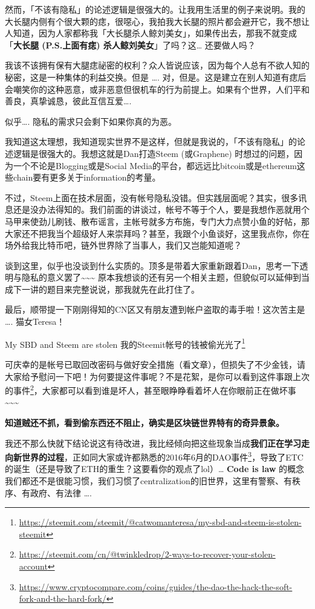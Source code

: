 \documentclass[]{ctexbook}
\renewcommand{\href}[2]{#2\footnote{\url{#1}}}
\begin{document}
然而，「不该有隐私」的论述逻辑是很强大的。让我用生活里的例子来说明。我的大长腿内侧有个很大颗的痣，很噁心，我拍我大长腿的照片都会避开它，我不想让人知道，因为人家都称我「大长腿杀人鲸刘美女」，如果传出去，那我不就变成「\textbf{大长腿 (P.S.上面有痣) 杀人鲸刘美女}」了吗？这\ldots{} 还要做人吗？

我该不该拥有保有大腿痣祕密的权利？众人皆说应该，因为每个人总有不欲人知的秘密，这是一种集体的利益交换。但是 \ldots{}. 对，但是。这是建立在别人知道有痣后会嘲笑你的这种恶意，或非恶意但很机车的行为前提上。如果有个世界，人们平和善良，真挚诚恳，彼此互信互爱\ldots{}.

似乎\ldots{}. 隐私的需求只会剩下如果你真的为恶。

我知道这太理想，我知道现实世界不是这样，但就是我说的，「不该有隐私」的论述逻辑是很强大的。我想这就是Dan打造Steem (或Graphene) 时想过的问题，因为一个不论是Blogging或是Social Media的平台，都远远比bitcoin或是ethereum这些chain要有更多关于information的考量。

不过，Steem上面在技术层面，没有帐号隐私没错。但实践层面呢？其实，很多讯息还是没办法得知的。我们前面的讲谈过，帐号不等于个人，要是我想作恶就用个马甲来使劲儿刷钱、散布谣言，主帐号就多方布施，专门大力点赞小鱼的好帖，那大家还不把我当个超级好人来崇拜吗？甚至，我跟个小鱼谈好，这里我点你，你在场外给我比特币吧，链外世界除了当事人，我们又岂能知道呢？

谈到这里，似乎也没谈到什么实质的。顶多是带着大家重新跟着Dan，思考一下透明与隐私的意义罢了\textasciitilde{}\textasciitilde{}\textasciitilde{} 原本我想谈的还有另一个相关主题，但貌似可以延伸到当成下一讲的题目来完整说说，那我就先在此打住了。

最后，顺带提一下刚刚得知的CN区又有朋友遭到帐户盗取的毒手啦！这次苦主是 \ldots{}. 猫女Teresa！

\href{https://steemit.com/steemit/@catwomanteresa/my-sbd-and-steem-is-stolen-steemit}{My SBD and Steem are stolen 我的Steemit帐号的钱被偷光光了}

可庆幸的是帐号已取回改密码与做好安全措施（看文章），但损失了不少金钱，请大家给予慰问一下吧！为何要提这件事呢？不是花絮，是你可以看到这件事跟上次的\href{https://steemit.com/cn/@twinkledrop/2-ways-to-recover-your-stolen-account}{事件}，大家都可以看到谁是坏人，甚至眼睁睁看着坏人在你眼前正在做坏事\textasciitilde{}\textasciitilde{}\textasciitilde{}

\textbf{知道贼还不抓，看到偷东西还不阻止，确实是区块链世界特有的奇异景象。}

我还不那么快就下结论说这有待改进，我比经倾向把这些现象当成\textbf{我们正在学习走向新世界的过程}，正如同大家或许都熟悉的2016年6月的\href{https://www.cryptocompare.com/coins/guides/the-dao-the-hack-the-soft-fork-and-the-hard-fork/}{DAO事件}，导致了ETC的诞生（还是导致了ETH的重生？这要看你的观点了lol）\ldots{} \textbf{Code is law} 的概念我们都还不是很能习惯，我们习惯了centralization的旧世界，这里有警察、有秩序、有政府、有法律 \ldots{}.
\end{document}
